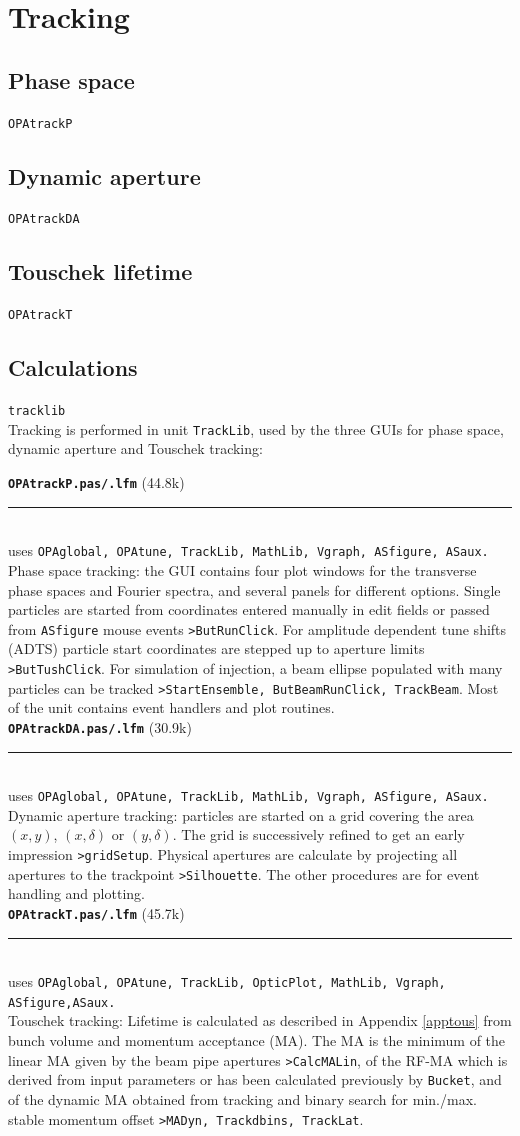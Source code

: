 \documentclass[12pt]{article}
\newcommand\code[1]{{\tt #1}}
\newcommand{\opagui}[1]{\colorbox{blue!20}{\code{#1}}}
\newcommand{\oguih}[2]{\subsection{\label{#2}#1}{\Huge\opagui{#2}}\\}
\newcommand{\opauni}[1]{\colorbox{orange!30}{\code{#1}}}
\newcommand{\ounih}[2]{\subsection{\label{#2}#1}{\Huge\opauni{#2}}\\}
\newcommand\opamodule[3]{{\bf \tt #1} #2\\  \rule[3pt]{\textwidth}{0.2pt} \\ {\scriptsize uses \tt  #3}\\[1ex]}
\begin{document}
\section{\label{sectrac}Tracking}

\oguih{Phase space}{OPAtrackP} 

\oguih{Dynamic aperture}{OPAtrackDA} 

\oguih{Touschek lifetime}{OPAtrackT} 

\ounih{Calculations}{tracklib}


Tracking is performed in unit {\tt TrackLib}, used by the three GUIs for phase space, dynamic aperture and Touschek tracking:

\opamodule{OPAtrackP.pas/.lfm}{(44.8k)}{OPAglobal,  OPAtune, TrackLib, MathLib, Vgraph, ASfigure, ASaux.}
Phase space tracking: the GUI contains four plot windows for the transverse phase spaces and Fourier spectra, and several panels for different options. Single particles are started from coordinates entered manually in edit fields or passed from {\tt ASfigure} mouse events \code{>ButRunClick}. For amplitude dependent tune shifts (ADTS) particle start coordinates are stepped up to aperture limits \code{>ButTushClick}. For simulation of injection, a beam ellipse populated with many particles can be tracked \code{>StartEnsemble, ButBeamRunClick, TrackBeam}. Most of the unit contains event handlers and plot routines.\\

\opamodule{OPAtrackDA.pas/.lfm}{(30.9k)}{OPAglobal,  OPAtune, TrackLib, MathLib, Vgraph, ASfigure, ASaux.}
Dynamic aperture tracking: particles are started on a grid covering the area $(x,y)$, $(x,\delta)$ or $(y,\delta)$. The grid is successively refined to get an early impression \code{>gridSetup}. Physical apertures are calculate by projecting all apertures to the trackpoint \code{>Silhouette}. The other procedures are for event handling and plotting.\\

\opamodule{OPAtrackT.pas/.lfm}{(45.7k)}{OPAglobal,  OPAtune, TrackLib, OpticPlot, MathLib, Vgraph, ASfigure,ASaux.}
Touschek tracking: Lifetime is calculated as described in Appendix \ref{apptous} from bunch volume and momentum acceptance (MA). The MA is the minimum of the linear MA given by the beam pipe apertures \code{>CalcMALin}, of the RF-MA which is derived from input parameters or has been calculated previously by {\tt Bucket}, and of the dynamic MA obtained from tracking and binary search for min./max. stable momentum offset \code{>MADyn, Trackdbins, TrackLat}.
\end{document}
